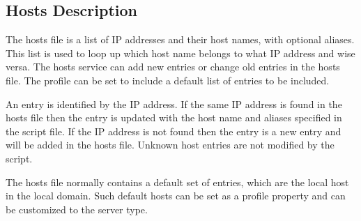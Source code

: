 \subsection{Hosts Description}

The hosts file is a list of IP addresses and their host names, with optional
aliases. This list is used to loop up which host name belongs to what 
IP address and wise versa. The hosts service can add new entries or change
old entries in the hosts file. The profile can be set to include a default
list of entries to be included.

An entry is identified by the IP address. If the same IP address is found
in the hosts file then the entry is updated with the host name and aliases
specified in the script file. If the IP address is not found then the 
entry is a new entry and will be added in the hosts file. Unknown host entries
are not modified by the script.

The hosts file normally contains a default set of entries, which are the local
host in the local domain. Such default hosts can be set as a profile property
and can be customized to the server type.
